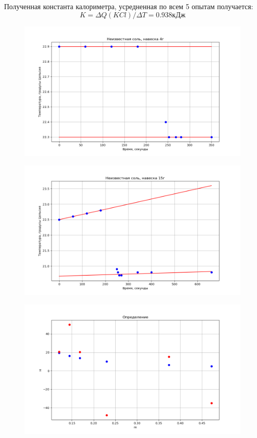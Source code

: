 \documentclass[a4paper, 12pt]{article}
\begin{document}
Полученная константа калориметра, усредненная по всем 5 опытам получается:
\[
K = \Delta Q(KCl)/\Delta T = 0.938кДж
\]
\begin{figure}[h!]
    \centering
    \includegraphics[width=150mm]{./pictures/u1.png}
    \caption{}
\end{figure}

\begin{figure}[h!]
    \centering
    \includegraphics[width=150mm]{./pictures/u2.png}
    \caption{}
\end{figure}

\begin{figure}[h!]
    \centering
    \includegraphics[width=150mm]{./pictures/uuu.png}
    \caption{}
\end{figure}
\end{document}
